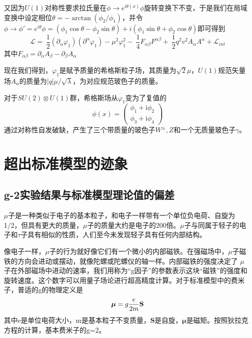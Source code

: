 又因为$U(1)$对称性要求拉氏量在$\phi\to e^{i\theta(x)}\phi$旋转变换下不变，于是我们在局域变换中设定相位$\theta=-\arctan{(\phi_2/\phi_1)}$，并令$\phi\to \phi'=e^{i\theta}\phi=(\phi_1\cos{\theta}-\phi_2\sin{\theta})
+i(\phi_1\sin{\theta}+\phi_2\cos{\theta})$即可得到
\begin{equation}
    \mathcal{L}=\ \frac{1}{2} (\partial_{\alpha}\varphi_1)(\partial^{\alpha}\varphi_1) 
-\mu^2\varphi_1^2  -\ \frac{1}{4}F_{\alpha\beta}F^{\alpha\beta} +\ \frac{1}{2}q^2 v^2 A_{\alpha}A^{\alpha} +\mathcal{L}_{int}
\end{equation}
其中$F_{\alpha\beta}=\partial_\alpha A_\beta-\partial_\beta A_\alpha$

现在我们得到，$\varphi_1$是赋予质量的希格斯粒子场，其质量为$\sqrt{2}\mu$，$U(1)$规范矢量场$A_\alpha$的质量为$|q|\mu/\sqrt{\lambda}$，为对应规范玻色子的质量。

对于$SU(2)\otimes U(1)$群，希格斯场从$\varphi_1$变为了复值的
\begin{equation}
    \phi (x) ={\left ( \begin{matrix} \phi_1 + \mathrm{i} \phi_2\\ \phi_3 + \mathrm{i} \phi_4 \end{matrix} \right )}
\end{equation}
通过对称性自发破缺，产生了三个带质量的玻色子$W^\pm,Z$和一个无质量玻色子$\gamma$。

\section{超出标准模型的迹象}
\subsection{g-2实验结果与标准模型理论值的偏差}
$\mu$子是一种类似于电子的基本粒子，和电子一样带有一个单位负电荷、自旋为1/2，但具有更大的质量，$\mu$子的质量大约是电子的200倍。$\mu$子与同属于轻子的电子和$\tau$子具有相似的性质，人们至今未发现轻子具有任何内部结构。

像电子一样，$\mu$子的行为就好像它们有一个微小的内部磁铁。在强磁场中，$\mu$子磁铁的方向会进动或摆动，就像陀螺或陀螺仪的轴一样。内部磁铁的强度决定了 $\mu$ 子在外部磁场中进动的速率，我们用称为“g因子”的参数表示这块“磁铁”的强度和旋转速度。这个数字可以用量子场论进行超高精度计算。对于标准模型中的费米子，普适的g的物理定义是
\begin{equation}
    \boldsymbol \mu = g {e \over 2m} \mathbf S 
\end{equation}
其中e是单位电荷大小，m是基本粒子不变质量，$\mathbf S $是自旋，$\boldsymbol\mu$是磁矩。按照狄拉克方程的计算，基本费米子的g=2。

